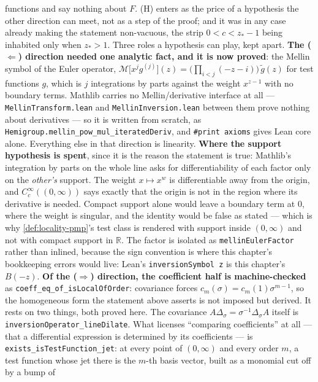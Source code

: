 \begin{lemma}[covariant local = polynomial symbol]
{functions and say nothing about $F$. (H) enters as the price of a hypothesis the other direction
can meet, not as a step of the proof; and it was in any case already making the statement
non-vacuous, the strip $0 < c < z_* - 1$ being inhabited only when $z_* > 1$. Three roles a
hypothesis can play, kept apart.
\textbf{The ($\Leftarrow$) direction needed one analytic fact, and it is now proved}: the Mellin
symbol of the Euler operator,
$\mathcal{M}\bigl[x^{j} g^{(j)}\bigr](z) = \bigl(\prod_{i<j}(-z-i)\bigr)\,\tilde g(z)$ for test
functions $g$, which is $j$ integrations by parts against the weight $x^{z-1}$ with no boundary
terms. Mathlib carries no Mellin/derivative interface at all --- \texttt{MellinTransform.lean} and
\texttt{MellinInversion.lean} between them prove nothing about derivatives --- so it is written
from scratch, as \texttt{Hemigroup.mellin\_pow\_mul\_iteratedDeriv}, and \texttt{\#print axioms}
gives Lean core alone. Everything else in that direction is linearity.
\textbf{Where the support hypothesis is spent}, since it is the reason the statement is true:
Mathlib's integration by parts on the whole line asks for differentiability of each factor only on
the \emph{other's} support. The weight $x \mapsto x^{w}$ is differentiable away from the origin,
and $C_c^\infty((0,\infty))$ says exactly that the origin is not in the region where its
derivative is needed. Compact support alone would leave a boundary term at $0$, where the weight
is singular, and the identity would be false as stated --- which is why \ref{def:locality-pmp}'s
test class is rendered with support inside $(0,\infty)$ and not with compact support in
$\mathbb{R}$.
The factor is isolated as \texttt{mellinEulerFactor} rather than inlined, because the sign
convention is where this chapter's bookkeeping errors would live: Lean's
\texttt{inversionSymbol z} is this chapter's $B(-z)$.
\textbf{Of the ($\Rightarrow$) direction, the coefficient half is machine-checked} as
\texttt{coeff\_eq\_of\_isLocalOfOrder}: covariance forces $c_m(\sigma) = c_m(1)\sigma^{m-1}$, so
the homogeneous form the statement above asserts is not imposed but derived. It rests on two
things, both proved here. The covariance $A\Delta_\sigma = \sigma^{-1}\Delta_\sigma A$ itself is
\texttt{inversionOperator\_lineDilate}. What licenses ``comparing coefficients'' at all --- that a
differential expression is determined by its coefficients --- is
\texttt{exists\_isTestFunction\_jet}: at every point of $(0,\infty)$ and every order $m$, a test
function whose jet there is the $m$-th basis vector, built as a monomial cut off by a bump of
}
\end{lemma}
